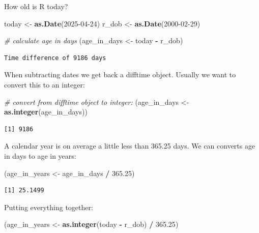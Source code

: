 \documentclass[
]{book}
\newenvironment{Shaded}{\begin{snugshade}}{\end{snugshade}}
\newcommand{\CommentTok}[1]{\textcolor[rgb]{0.56,0.35,0.01}{\textit{#1}}}
\newcommand{\FloatTok}[1]{\textcolor[rgb]{0.00,0.00,0.81}{#1}}
\newcommand{\FunctionTok}[1]{\textcolor[rgb]{0.13,0.29,0.53}{\textbf{#1}}}
\newcommand{\NormalTok}[1]{#1}
\newcommand{\OtherTok}[1]{\textcolor[rgb]{0.56,0.35,0.01}{#1}}
\newcommand{\SpecialCharTok}[1]{\textcolor[rgb]{0.81,0.36,0.00}{\textbf{#1}}}
\newcommand{\StringTok}[1]{\textcolor[rgb]{0.31,0.60,0.02}{#1}}
\begin{document}
How old is R today?

\begin{Shaded}
\begin{Highlighting}[]
\NormalTok{today }\OtherTok{\textless{}{-}} \FunctionTok{as.Date}\NormalTok{(}\StringTok{\textquotesingle{}2025{-}04{-}24\textquotesingle{}}\NormalTok{)}
\NormalTok{r\_dob }\OtherTok{\textless{}{-}} \FunctionTok{as.Date}\NormalTok{(}\StringTok{\textquotesingle{}2000{-}02{-}29\textquotesingle{}}\NormalTok{)}

\CommentTok{\# calculate age in days}
\NormalTok{(age\_in\_days }\OtherTok{\textless{}{-}}\NormalTok{ today }\SpecialCharTok{{-}}\NormalTok{ r\_dob)}
\end{Highlighting}
\end{Shaded}

\begin{verbatim}
Time difference of 9186 days
\end{verbatim}

When subtracting dates we get back a difftime object. Usually we want to
convert this to an integer:

\begin{Shaded}
\begin{Highlighting}[]
\CommentTok{\# convert from difftime object to integer:}
\NormalTok{(age\_in\_days }\OtherTok{\textless{}{-}} \FunctionTok{as.integer}\NormalTok{(age\_in\_days))}
\end{Highlighting}
\end{Shaded}

\begin{verbatim}
[1] 9186
\end{verbatim}

A calendar year is on average a little less than 365.25 days. We can
converts age in days to age in years:

\begin{Shaded}
\begin{Highlighting}[]
\NormalTok{(age\_in\_years }\OtherTok{\textless{}{-}}\NormalTok{ age\_in\_days }\SpecialCharTok{/} \FloatTok{365.25}\NormalTok{)}
\end{Highlighting}
\end{Shaded}

\begin{verbatim}
[1] 25.1499
\end{verbatim}

Putting everything together:

\begin{Shaded}
\begin{Highlighting}[]
\NormalTok{(age\_in\_years }\OtherTok{\textless{}{-}} \FunctionTok{as.integer}\NormalTok{(today }\SpecialCharTok{{-}}\NormalTok{ r\_dob) }\SpecialCharTok{/} \FloatTok{365.25}\NormalTok{)}
\end{Highlighting}
\end{Shaded}
\end{document}
